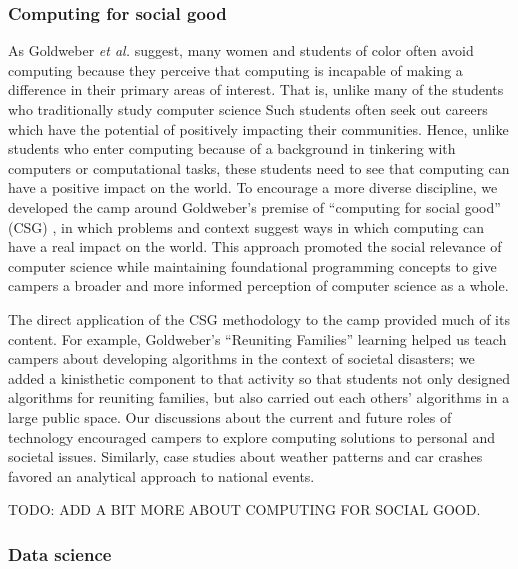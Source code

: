 \subsubsection{Computing for social good}

As Goldweber \textit{et al.} \cite{Goldweber2013} suggest, many women
and students of color often avoid computing because they perceive
that computing is incapable of making a difference in their primary
areas of interest.  That is, unlike many of the students who
traditionally study computer science Such students often seek out
careers which have the potential of positively impacting their
communities.  Hence, unlike students who enter computing because
of a background in tinkering with computers or computational tasks,
these students need to see that computing can have a positive impact
on the world.  To encourage a more diverse discipline, we developed
the camp around Goldweber's premise of ``computing for social good''
(CSG) \cite{Goldweber2015}, in which problems and context suggest ways
in which computing can have a real impact on the world.  This
approach promoted the social relevance of computer science while
maintaining foundational programming concepts to give campers a
broader and more informed perception of computer science as a whole.

The direct application of the CSG methodology to the camp provided
much of its content. For example, Goldweber's ``Reuniting Families''
learning helped us teach campers about developing algorithms in the
context of societal disasters; we added a kinisthetic component to
that activity so that students not only designed algorithms for
reuniting families, but also carried out each others' algorithms
in a large public space.  Our discussions about the current and
future roles of technology encouraged campers to explore computing
solutions to personal and societal issues.  Similarly, case studies
about weather patterns and car crashes favored an analytical approach
to national events.

TODO: ADD A BIT MORE ABOUT COMPUTING FOR SOCIAL GOOD.

\subsubsection{Data science}

